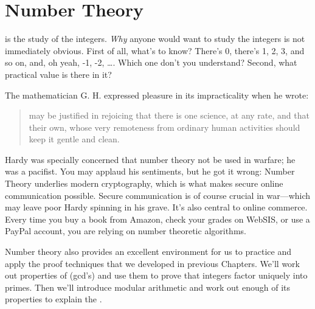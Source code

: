 \chapter{Number Theory}\label{number_theory_chap}
 is the study of the integers.  \emph{Why} anyone
would want to study the integers is not immediately obvious.  First of
all, what's to know?  There's 0, there's 1, 2, 3, and so on, and, oh yeah,
-1, -2, \dots.   Which one don't you understand?  Second, what practical
value is there in it?

\iffalse
Number theory is right at the core of mathematics; even Ug the Caveman
surely had some grasp of the integers---at least the positive ones.
In fact, the integers are so elementary that one might ask, ``What's
to study?''  There's 0, there's 1, 2, 3 and so on, and there's the
negatives.  Which one don't you understand?  Doesn't math become easy
when we don't have to worry about nasty numbers like $\sqrt{7}$, $1 /
\pi$, and $i$?  We can even forget about fractions!
\fi

The mathematician G. H.  expressed pleasure in its
impracticality when he wrote:
%
 \begin{quotation}
  may be justified in rejoicing that there
 is one science, at any rate, and that their own, whose very remoteness
 from ordinary human activities should keep it gentle and clean.
 \end{quotation}
%

 Hardy was specially concerned that number theory not be used in
 warfare; he was a pacifist.  You may applaud his sentiments, but he
 got it wrong: Number Theory underlies modern cryptography, which is
 what makes secure online communication possible.  Secure
 communication is of course crucial in war---which may leave poor
 Hardy spinning in his grave.  It's also central to online commerce.
 Every time you buy a book from Amazon, check your grades on WebSIS,
 or use a PayPal account, you are relying on number theoretic
 algorithms.

Number theory also provides an excellent environment for us to
practice and apply the proof techniques that we developed in previous
Chapters.  We'll work out properties of 
(gcd's) and use them to prove that integers factor uniquely into
primes.  Then we'll introduce modular arithmetic and work out enough
of its properties to explain the .


